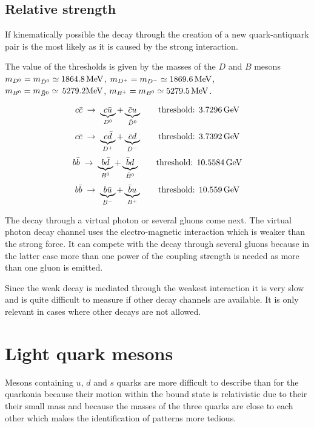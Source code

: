 \documentclass[12pt]{article}
\begin{document}
\subsection{Relative strength}
If kinematically possible the decay through the creation of a new quark-antiquark pair is the most likely as it is caused by the strong interaction.

The value of the thresholds is given by the masses of the $D$ and $B$ mesons 
$m_{D^0}=m_{\bar D^{0}}\simeq 1864.8 \,{\rm  MeV}$,
$m_{D^+}=m_{D^{-}}\simeq 1869.6 \,{\rm  MeV}$,
$m_{B^0}=m_{\bar B^{0}}\simeq \,{\rm  5279.2 MeV}$,
$m_{B^+}=m_{ B^{0}}\simeq 5279.5\,{\rm  MeV}$.

\[c\bar c \;\rightarrow\; \underbrace{c\bar u}_{D^0}+\underbrace{\bar c u}_{\bar D^0}\qquad \mbox{threshold: } 3.7296\,{\rm  GeV}\]
\[c\bar c \;\rightarrow\; \underbrace{c\bar d}_{D^+}+\underbrace{\bar c d}_{D^-}\qquad \mbox{threshold: } 3.7392\,{\rm  GeV}\]
\[b\bar b \;\rightarrow\; \underbrace{b\bar d}_{B^0}+\underbrace{\bar b d}_{\bar B^0}\qquad \mbox{threshold: } 10.5584\,{\rm  GeV}\]
\[b\bar b \;\rightarrow\; \underbrace{b\bar u}_{B^-}+\underbrace{\bar b u}_{B^+}\qquad \mbox{threshold: } 10.559\,{\rm  GeV}\]

The decay through a virtual photon or several gluons come next. The virtual photon decay channel uses the electro-magnetic interaction which is weaker than the strong force. It can compete with the decay through several gluons because in the latter case more than one power of the coupling strength is needed as more than one gluon is emitted.

Since the weak decay is mediated through the weakest interaction it is very slow and is quite difficult to measure if other decay channels are available. It is only relevant in cases where other decays are not allowed. 

\clearpage
\section{Light quark mesons}
Mesons containing $u$, $d$ and $s$ quarks are more difficult to describe than for the quarkonia because their motion within the bound state is relativistic due to their their small mass and because the masses of the three quarks are close to each other which makes the identification of patterns more tedious.
%
%
\end{document}
